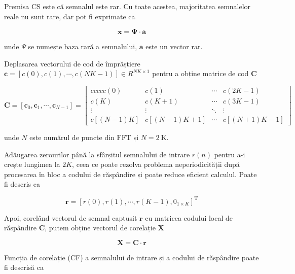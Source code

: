 \documentclass[10pt]{report}
\begin{document}
Premisa CS este că semnalul este rar. Cu toate acestea, majoritatea semnalelor reale nu sunt rare, dar pot fi exprimate ca

\begin{equation}
    \mathbf{x}=\boldsymbol{\Psi} \cdot \mathbf{a}
\end{equation}

unde \(\Psi\) se numește baza rară a semnalului, \(\mathbf{a}\) este un vector rar.

Deplasarea vectorului de cod de împrăștiere \(\mathbf{c}=[c(0), c(1), \cdots, c(N K-1)] \in R^{N K \times 1}\) pentru a obține matrice de cod \(\mathbf{C}\)

\begin{equation}
    \mathbf{C}=\left[\mathbf{c}_{0}, \mathbf{c}_{1}, \cdots, \mathbf{c}_{N-1}\right]=\left[ \begin{matrix}{cccc}
            c(0)       & c(1)         & \cdots & c(2 K-1)     \\
            c(K)       & c(K+1)       & \cdots & c(3 K-1)     \\
            \vdots     & \vdots       & \ddots & \vdots       \\
            c[(N-1) K] & c[(N-1) K+1] & \cdots & c[(N+1) K-1]
        \end{matrix}\right]
\end{equation}

unde \(N\) este numărul de puncte din \(\mathrm{FFT}\) și \(N=2 \mathrm{~K}\).

Adăugarea zerourilor până la sfârșitul semnalului de intrare \(r(n)\) pentru a-i crește lungimea la \(2 K\), ceea ce poate rezolva problema neperiodicității după procesarea în bloc a codului de răspândire și poate reduce eficient calculul. Poate fi descris ca

\begin{equation}
    \mathbf{r}=\left[r(0), r(1), \cdots, r(K-1), 0_{1 \times K}\right]^{\mathrm{T}}
\end{equation}

Apoi, corelând vectorul de semnal captusit \(\mathbf{r}\) cu matricea codului local de răspândire \(\mathbf{C}\), putem obține vectorul de corelație \(\mathbf{X}\)

\begin{equation}
    \mathbf{X}=\mathbf{C} \cdot \mathbf{r}
\end{equation}

Funcția de corelație (CF) a semnalului de intrare și a codului de răspândire poate fi descrisă ca
\end{document}
